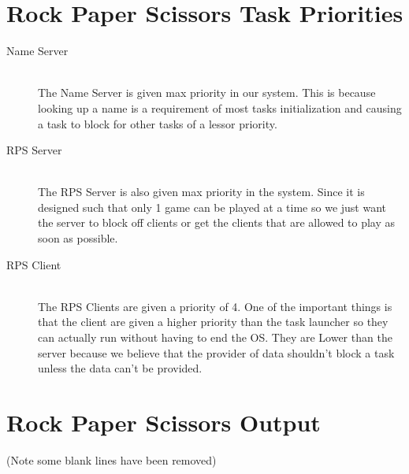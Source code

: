 \documentclass[pdftex,10pt,a4paper]{article}
\begin{document}
\section*{Rock Paper Scissors Task Priorities}
\begin{description}
\item[Name Server] \hfill \\
The Name Server is given max priority in our system. This is because looking 
up a name is a requirement of most tasks initialization and causing a task to 
block for other tasks of a lessor priority.

\item[RPS Server] \hfill \\
The RPS Server is also given max priority in the system. Since it is designed
such that only 1 game can be played at a time so we just want the server to block
off clients or get the clients that are allowed to play as soon as possible.

\item[RPS Client] \hfill \\
The RPS Clients are given a priority of 4. One of the important things is that
the client are given a higher priority than the task launcher so they can actually
run without having to end the OS. They are Lower than the server because we believe
that the provider of data shouldn't block a task unless the data can't be provided.
\end{description}

\section*{Rock Paper Scissors Output}


(Note some blank lines have been removed)
\end{document}
